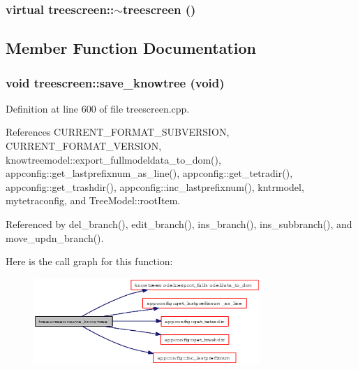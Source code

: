 \subsubsection{\setlength{\rightskip}{0pt plus 5cm}virtual treescreen::$\sim$treescreen ()\hspace{0.3cm}{\tt  [virtual]}}\label{classtreescreen_2da908325cdc8c114ed66ba0513765aa}




\subsection{Member Function Documentation}
\subsubsection{\setlength{\rightskip}{0pt plus 5cm}void treescreen::save\_\-knowtree (void)}\label{classtreescreen_5ecf27898d34e891ee560e25d28e8ffa}




Definition at line 600 of file treescreen.cpp.

References CURRENT\_\-FORMAT\_\-SUBVERSION, CURRENT\_\-FORMAT\_\-VERSION, knowtreemodel::export\_\-fullmodeldata\_\-to\_\-dom(), appconfig::get\_\-lastprefixnum\_\-as\_\-line(), appconfig::get\_\-tetradir(), appconfig::get\_\-trashdir(), appconfig::inc\_\-lastprefixnum(), kntrmodel, mytetraconfig, and Tree\-Model::root\-Item.

Referenced by del\_\-branch(), edit\_\-branch(), ins\_\-branch(), ins\_\-subbranch(), and move\_\-updn\_\-branch().

Here is the call graph for this function:\begin{figure}[H]
\begin{center}
\leavevmode
\includegraphics[width=244pt]{classtreescreen_5ecf27898d34e891ee560e25d28e8ffa_cgraph}
\end{center}
\end{figure}



